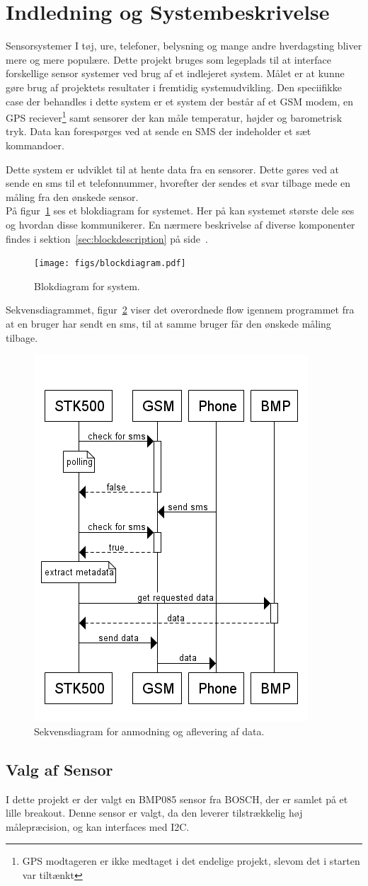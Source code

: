 \section{Indledning og Systembeskrivelse}

Sensorsystemer I tøj, ure, telefoner, belysning og mange andre hverdagsting bliver mere og mere populære. Dette projekt bruges som 
legeplads til at interface forskellige sensor systemer ved brug af et indlejeret system. Målet er at kunne gøre brug af projektets 
resultater i fremtidig systemudvikling. Den speciifikke case der behandles i dette system er et system der består af et GSM modem, 
en GPS reciever\footnote{GPS modtageren er ikke medtaget i det endelige projekt, slevom det i starten var tiltænkt} samt sensorer der kan måle temperatur, 
højder og barometrisk tryk. Data kan forespørges ved at sende en SMS der indeholder et sæt kommandoer.

Dette system er udviklet til at hente data fra en sensorer. Dette gøres ved at sende en sms til et telefonnummer, hvorefter der 
sendes et svar tilbage mede en måling fra den ønskede sensor.\\

På figur~\ref{fig:blockdiagram} ses et blokdiagram for systemet. Her på kan systemet største dele ses og hvordan disse kommunikerer. 
En nærmere beskrivelse af diverse komponenter findes i sektion~\ref{sec:blockdescription} på side~\pageref{sec:blockdescription}.

\vskip 0.5cm
\begin{figure}[h]
	\centering
	\texttt{[image: figs/blockdiagram.pdf]}
	\caption{Blokdiagram for system.}
	\label{fig:blockdiagram}
\end{figure}
\vskip 0.5cm

Sekvensdiagrammet, figur~\ref{fig:seq-getdata} viser det overordnede flow igennem programmet fra at en bruger har sendt en sms, til at samme bruger får den ønskede måling tilbage.

\begin{figure}[h]
	\centering
	\includegraphics[width=0.56\linewidth]{figs/seq-getdata.png}
	\caption{Sekvensdiagram for anmodning og aflevering af data.}
	\label{fig:seq-getdata}
\end{figure}

\subsection{Valg af Sensor}
I dette projekt er der valgt en BMP085 sensor fra BOSCH, der er samlet på et lille breakout. Denne sensor er valgt, da den leverer tilstrækkelig høj målepræcision, og 
kan interfaces med I2C.
